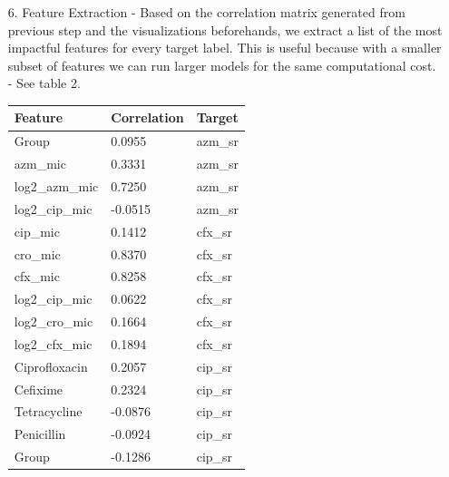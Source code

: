 \documentclass[manuscript,screen,review, nonacm]{acmart}
\begin{document}
\begin{itemize}
    \item[6.] Feature Extraction - Based on the correlation matrix generated from previous step and the visualizations beforehands, we extract a list of the most
    impactful features for every target label. This is useful because with a smaller subset of features we can run larger models for the same computational cost. - See table 2.
            \begin{table}[H]
                \centering
                \begin{tabular}{|l|l|l|}
                \hline
                \textbf{Feature}           & \textbf{Correlation} & \textbf{Target} \\ \hline
                Group                      & 0.0955               & azm\_sr         \\ \hline
                azm\_mic                   & 0.3331               & azm\_sr         \\ \hline
                log2\_azm\_mic             & 0.7250               & azm\_sr         \\ \hline
                log2\_cip\_mic             & -0.0515              & azm\_sr         \\ \hline
                cip\_mic                   & 0.1412               & cfx\_sr         \\ \hline
                cro\_mic                   & 0.8370               & cfx\_sr         \\ \hline
                cfx\_mic                   & 0.8258               & cfx\_sr         \\ \hline
                log2\_cip\_mic             & 0.0622               & cfx\_sr         \\ \hline
                log2\_cro\_mic             & 0.1664               & cfx\_sr         \\ \hline
                log2\_cfx\_mic             & 0.1894               & cfx\_sr         \\ \hline
                Ciprofloxacin              & 0.2057               & cip\_sr         \\ \hline
                Cefixime                   & 0.2324               & cip\_sr         \\ \hline
                Tetracycline               & -0.0876              & cip\_sr         \\ \hline
                Penicillin                 & -0.0924              & cip\_sr         \\ \hline
                Group                      & -0.1286              & cip\_sr         \\ \hline

\end{tabular}
\end{table}
\end{itemize}
\end{document}
